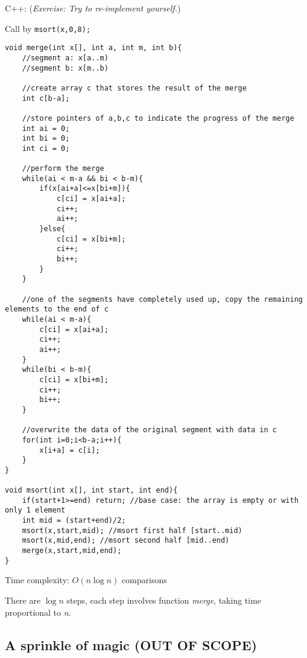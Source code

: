 
C++: (\textit{Exercise: Try to re-implement yourself.})

Call by \texttt{msort(x,0,8);}

\begin{lstlisting}
void merge(int x[], int a, int m, int b){
    //segment a: x[a..m)
    //segment b: x[m..b)

    //create array c that stores the result of the merge 
    int c[b-a];

    //store pointers of a,b,c to indicate the progress of the merge
    int ai = 0;
    int bi = 0; 
    int ci = 0;
    
    //perform the merge
    while(ai < m-a && bi < b-m){
        if(x[ai+a]<=x[bi+m]){
            c[ci] = x[ai+a];
            ci++;
            ai++;
        }else{
            c[ci] = x[bi+m];
            ci++;
            bi++;
        }
    }

    //one of the segments have completely used up, copy the remaining elements to the end of c
    while(ai < m-a){
        c[ci] = x[ai+a];
        ci++;
        ai++;
    }
    while(bi < b-m){
        c[ci] = x[bi+m];
        ci++;
        bi++;
    }

    //overwrite the data of the original segment with data in c
    for(int i=0;i<b-a;i++){
        x[i+a] = c[i];
    }
}

void msort(int x[], int start, int end){
    if(start+1>=end) return; //base case: the array is empty or with only 1 element
    int mid = (start+end)/2;
    msort(x,start,mid); //msort first half [start..mid)
    msort(x,mid,end); //msort second half [mid..end)
    merge(x,start,mid,end);
}
\end{lstlisting}

Time complexity: $O(n\log n)$ comparisons
\vspace{6mm}

There are $\log n$ steps, each step involves function \textit{merge}, taking time proportional to \textit{n}.

\subsection*{A sprinkle of magic (OUT OF SCOPE)}

